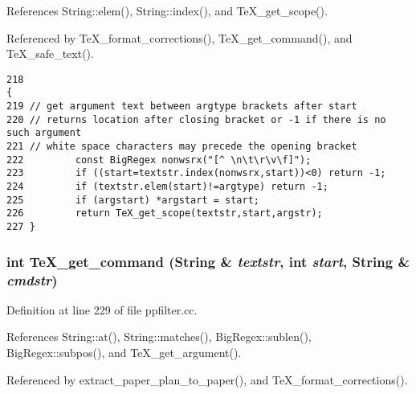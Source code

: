 References String::elem(), String::index(), and Te\-X\_\-get\_\-scope().

Referenced by Te\-X\_\-format\_\-corrections(), Te\-X\_\-get\_\-command(), and Te\-X\_\-safe\_\-text().



\footnotesize\begin{verbatim}218                                                                                                         {
219 // get argument text between argtype brackets after start
220 // returns location after closing bracket or -1 if there is no such argument
221 // white space characters may precede the opening bracket
222         const BigRegex nonwsrx("[^ \n\t\r\v\f]");
223         if ((start=textstr.index(nonwsrx,start))<0) return -1;
224         if (textstr.elem(start)!=argtype) return -1;
225         if (argstart) *argstart = start;
226         return TeX_get_scope(textstr,start,argstr);
227 }
\end{verbatim}\normalsize 
{}
\subsubsection{\setlength{\rightskip}{0pt plus 5cm}int Te\-X\_\-get\_\-command ({\bf String} \& {\em textstr}, int {\em start}, {\bf String} \& {\em cmdstr})}\label{dil2al_8hh_a352}




Definition at line 229 of file ppfilter.cc.

References String::at(), String::matches(), Big\-Regex::sublen(), Big\-Regex::subpos(), and Te\-X\_\-get\_\-argument().

Referenced by extract\_\-paper\_\-plan\_\-to\_\-paper(), and Te\-X\_\-format\_\-corrections().



